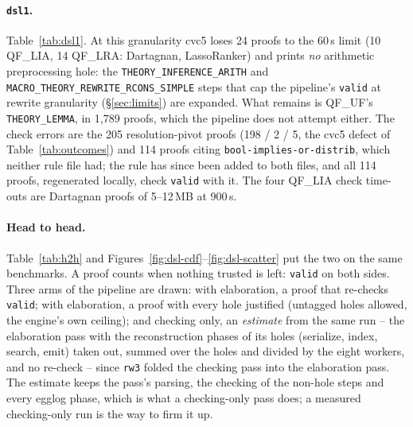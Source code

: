 \documentclass[11pt,a4paper]{article}
\newcommand{\UF}{QF\_UF}
\newcommand{\LIA}{QF\_LIA}
\newcommand{\LRA}{QF\_LRA}
\newcommand{\code}[1]{\texttt{#1}}
\begin{document}
\paragraph{\code{dsl1}.} Table~\ref{tab:dsl1}. At this granularity cvc5
loses 24 proofs to the 60\,s limit (10 \LIA{}, 14 \LRA{}: Dartagnan,
LassoRanker) and prints \emph{no} arithmetic preprocessing hole: the
\code{THEORY\_INFERENCE\_ARITH} and \code{MACRO\_THEORY\_REWRITE\_RCONS\_SIMPLE}
steps that cap the pipeline's \code{valid} at rewrite granularity
(\S\ref{sec:limits}) are expanded. What remains is \UF{}'s
\code{THEORY\_LEMMA}, in 1,789 proofs, which the pipeline does not attempt
either. The check errors are the 205 resolution-pivot proofs (198 / 2 / 5,
the cvc5 defect of Table~\ref{tab:outcomes}) and 114 proofs citing
\code{bool-implies-or-distrib}, which neither rule file had; the rule has
since been added to both files, and all 114 proofs, regenerated locally,
check \code{valid} with it. The four \LIA{} check time-outs are Dartagnan
proofs of 5--12\,MB at 900\,s.

\begin{table}[htbp]\centering\footnotesize
\resizebox{\textwidth}{!}{}
\caption{cvc5 at \code{dsl-rewrite} granularity, checked by Carcara.
  ``holes left'' are the \code{hole} steps in the complete proofs, all
  \code{THEORY\_LEMMA}; ``rule missing'' the proofs citing a rule the
  171-rule file lacked.}\label{tab:dsl1}
\end{table}

\paragraph{Head to head.} Table~\ref{tab:h2h} and
Figures~\ref{fig:dsl-cdf}--\ref{fig:dsl-scatter} put the two on the same
benchmarks. A proof counts when nothing trusted is left: \code{valid} on
both sides. Three arms of the pipeline are drawn: with elaboration, a proof
that re-checks \code{valid}; with elaboration, a proof with every hole
justified (untagged holes allowed, the engine's own ceiling); and checking
only, an \emph{estimate} from the same run -- the elaboration pass with the
reconstruction phases of its holes (serialize, index, search, emit) taken
out, summed over the holes and divided by the eight workers, and no
re-check -- since \code{rw3} folded the checking pass into the elaboration
pass. The estimate keeps the pass's parsing, the checking of the non-hole
steps and every egglog phase, which is what a checking-only pass does; a
measured checking-only run is the way to firm it up.
\end{document}
